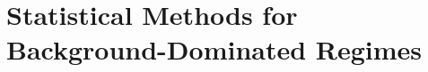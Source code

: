 \chapter[Statistical Methods for Background-Dominated Regimes]{Statistical Methods for Background-Dominated Regimes}
\label{ch:methods}
\glsresetall






% 
